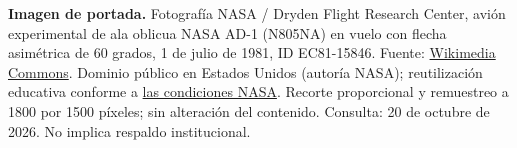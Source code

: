 \noindent\textbf{Imagen de portada.} Fotografía NASA / Dryden Flight Research Center,
avión experimental de ala oblicua NASA AD-1 (N805NA) en vuelo con flecha asimétrica de 60 grados, 1 de julio de 1981, ID EC81-15846. Fuente: \href{https://commons.wikimedia.org/wiki/File:AD-1_in_flight_(EC81-15846).jpg}{Wikimedia Commons}.
Dominio público en Estados Unidos (autoría NASA); reutilización educativa conforme a \href{https://www.nasa.gov/nasa-brand-center/images-and-media/}{las condiciones NASA}. Recorte proporcional y remuestreo a 1800 por 1500 píxeles; sin alteración del contenido. Consulta: 20 de octubre de 2026. No implica respaldo institucional.
